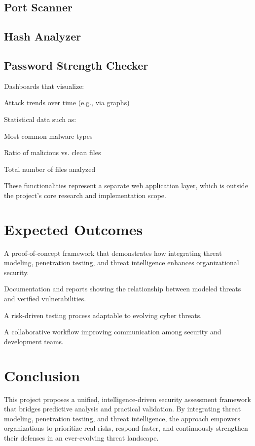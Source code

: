\documentclass[12pt,a4paper]{report}
\begin{document}
\subsection{Port Scanner}

\subsection{Hash Analyzer}

\subsection{Password Strength Checker}

Dashboards that visualize:

Attack trends over time (e.g., via graphs)

Statistical data such as:

Most common malware types

Ratio of malicious vs. clean files

Total number of files analyzed

These functionalities represent a separate web application layer, which is outside the project’s core research and implementation scope.

\section{Expected Outcomes}

A proof-of-concept framework that demonstrates how integrating threat modeling, penetration testing, and threat intelligence enhances organizational security.

Documentation and reports showing the relationship between modeled threats and verified vulnerabilities.

A risk-driven testing process adaptable to evolving cyber threats.

A collaborative workflow improving communication among security and development teams.

\section{Conclusion}

This project proposes a unified, intelligence-driven security assessment framework that bridges predictive analysis and practical validation.
 By integrating threat modeling, penetration testing, and threat intelligence, the approach empowers organizations to prioritize real risks, respond faster, and continuously strengthen their defenses in an ever-evolving threat landscape.
\end{document}
